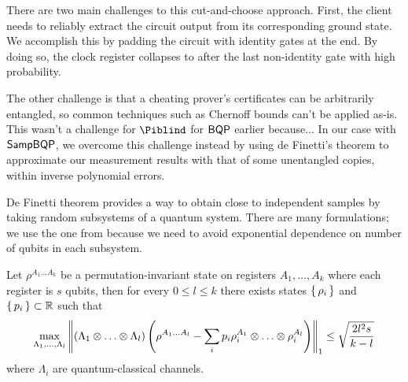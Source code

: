 There are two main challenges to this cut-and-choose approach.
First, the client needs to reliably extract the circuit output from its corresponding ground state.
We accomplish this by padding the circuit with identity gates at the end.
By doing so, the clock register collapses to after the last non-identity gate with high probability.

The other challenge is that a cheating prover's certificates can be arbitrarily entangled,
so common techniques such as Chernoff bounds can't be applied as-is.
This wasn't a challenge for $\Piblind$ for $\operatorname{\mathsf{BQP}}$ earlier because...
In our case with $\operatorname{\mathsf{SampBQP}}$, we overcome this challenge instead by using de Finetti's theorem
to approximate our measurement results with that of some unentangled copies,
within inverse polynomial errors.





De Finetti theorem provides a way to obtain close to independent samples by taking random subsystems of a quantum system.
There are many formulations; we use the one from \cite{Brandão2017} because we need to avoid exponential dependence on number of qubits in each subsystem.
\begin{thm}
	\label{deFinetti}
	Let $\rho^{A_1\ldots A_k}$ be a permutation-invariant state on registers $A_1,\ldots,A_k$ where each register is $s$ qubits,
	then for every $0\leq l\leq k$ there exists states $\set{\rho_i}$ and $\set{p_i}\subset\mathbb{R}$ such that
	$$\max_{\Lambda_1,\ldots,\Lambda_l}
	\left\lVert(\Lambda_1\otimes\ldots\otimes\Lambda_l)\left(\rho^{A_1\ldots A_l}-\sum_ip_i\rho_i^{A_1}\otimes\ldots\otimes\rho_i^{A_l}\right)\right\rVert_1
	\leq\sqrt{\frac{2l^2s}{k-l}}$$
	where $\Lambda_i$ are quantum-classical channels.
\end{thm}







